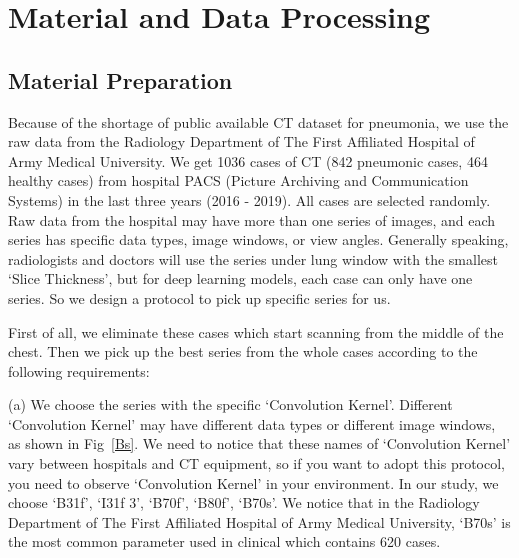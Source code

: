 \documentclass[journal]{IEEEtran}
\begin{document}
\section{Material and Data Processing}
\label{datasetprocessing}
\subsection{Material Preparation}
\label{ctimagedata}
Because of the shortage of public available CT dataset for pneumonia, we use the raw data from the Radiology Department of The First Affiliated Hospital of Army Medical University. We get 1036 cases of CT (842 pneumonic cases, 464 healthy cases) from hospital PACS (Picture Archiving and Communication Systems) in the last three years (2016 - 2019). All cases are selected randomly.
Raw data from the hospital may have more than one series of images, and each series has specific data types, image windows, or view angles. 
Generally speaking, radiologists and doctors will use the series under lung window with the smallest `Slice Thickness', but for deep learning models, each case can only have one series. So we design a protocol to pick up specific series for us.

First of all, we eliminate these cases which start scanning from the middle of the chest. Then we pick up the best series from the whole cases according to the following requirements:

(a) We choose the series with the specific `Convolution Kernel'. Different `Convolution Kernel' may have different data types or different image windows, as shown in Fig~\ref{Bs}. We need to notice that these names of `Convolution Kernel' vary between hospitals and CT equipment, so if you want to adopt this protocol, you need to observe `Convolution Kernel' in your environment. In our study, we choose `B31f', `I31f 3', `B70f', `B80f', `B70s'. We notice that in the Radiology Department of The First Affiliated Hospital of Army Medical University, `B70s' is the most common parameter used in clinical which contains 620 cases.
\end{document}
